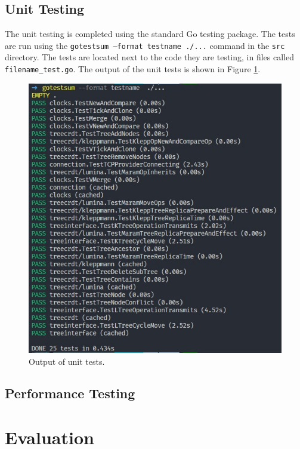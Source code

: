 \documentclass[12pt]{report}
\begin{document}
\section{Unit Testing}
The unit testing is completed using the standard Go testing package. The tests are run using the \texttt{gotestsum --format testname  ./...} command in the \texttt{src} directory. The tests are located next to the code they are testing, in files called \texttt{filename\_test.go}. The output of the unit tests is shown in Figure \ref{fig:testing}. \par

\begin{figure}[h]
    \centering
    \includegraphics[width=1\textwidth]{images/tests_out.jpg}
    \caption{Output of unit tests.}
    \label{fig:testing}
\end{figure}

\section{Performance Testing}



\chapter{Evaluation}
\end{document}

